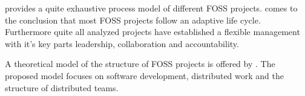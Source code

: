 \textcite{Johnson2001} provides a quite exhaustive process model of different
\ac{FOSS} projects. \citeauthor{Johnson2001} comes to the conclusion that most
\ac{FOSS} projects follow an adaptive life cycle. Furthermore quite all analyzed
projects have established a flexible management with it's key parts leadership,
collaboration and accountability.

A theoretical model of the structure of \ac{FOSS} projects is offered by
\textcite{Crowston2005}. The proposed model focuses on software development,
distributed work and the structure of distributed teams.


